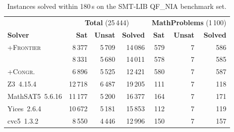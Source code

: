 \begin{table}[t]
	\centering
	\setlength{\tabcolsep}{0.8em}
	\renewcommand{\arraystretch}{1.2}
	\begin{tabular}{lrrr|rrr}
		\hline
		                          & \multicolumn{3}{c|}{\textbf{Total} (25\,444)} & \multicolumn{3}{c}{\textbf{MathProblems} (1\,100)}                                                                     \\
		\textbf{Solver}           & \textbf{Sat}                                  & \textbf{Unsat}                                     & \textbf{Solved} & \textbf{Sat} & \textbf{Unsat} & \textbf{Solved} \\
		\hline
		\solver+\textsc{Frontier} & 8\,377                                        & 5\,709                                             & 14\,086         & 579          & 7              & 586             \\
		\solver                   & 8\,331                                        & 5\,680                                             & 14\,011         & 578          & 7              & 585             \\
		\solver+\textsc{Congr.}   & 6\,896                                        & 5\,525                                             & 12\,421         & 580          & 7              & 587             \\
		\hline
		Z3~4.15.4                 & 12\,718                                       & 6\,487                                             & 19\,205         & 111          & 7              & 118             \\
		MathSAT5~5.6.16           & 11\,177                                       & 5\,200                                             & 16\,377         & 164          & 7              & 171             \\
		Yices~2.6.4               & 10\,672                                       & 5\,181                                             & 15\,853         & 112          & 7              & 119             \\
		cvc5~1.3.2                & 8\,550                                        & 4\,446                                             & 12\,996         & 150          & 7              & 157             \\
		\hline
	\end{tabular}
	\vspace{0.9em}
	\caption{Instances solved within 180\,s on the SMT-LIB QF\_NIA benchmark set.\label{tab:results}}
\end{table}
